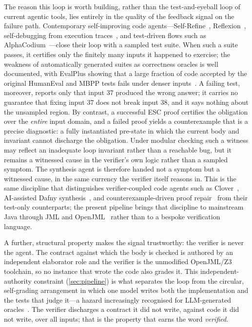 The reason this loop is worth building, rather than the test-and-eyeball loop of current agentic tools, lies entirely in the quality of the feedback signal on the failure path. Contemporary self-improving code agents---Self-Refine~\cite{madaan2023selfrefine}, Reflexion~\cite{shinn2023reflexion}, self-debugging from execution traces~\cite{chen2024selfdebug}, and test-driven flows such as AlphaCodium~\cite{ridnik2024alphacodium}---close their loop with a sampled test suite. When such a suite passes, it certifies only the finitely many inputs it happened to exercise; the weakness of automatically generated suites as correctness oracles is well documented, with EvalPlus showing that a large fraction of code accepted by the original HumanEval and MBPP tests fails under denser inputs~\cite{liu2023evalplus,chen2021codex,austin2021mbpp}. A failing test, moreover, reports only that input $37$ produced the wrong answer; it carries no guarantee that fixing input $37$ does not break input $38$, and it says nothing about the unsampled region. By contrast, a successful ESC proof certifies the obligation over the \emph{entire} input domain, and a failed proof yields a counterexample that is a precise diagnostic: a fully instantiated pre-state in which the current body and invariant cannot discharge the obligation. Under modular checking such a witness may reflect an inadequate loop invariant rather than a reachable bug, but it remains a witnessed cause in the verifier's own logic rather than a sampled symptom. The synthesis agent is therefore handed not a symptom but a witnessed cause, in the same currency the verifier itself reasons in. This is the same discipline that distinguishes verifier-coupled code agents such as Clover~\cite{sun2024clover}, AI-assisted Dafny synthesis~\cite{misu2024dafny,leino2010dafny}, and counterexample-driven proof repair~\cite{yang2025verus,mugnier2025dafnypro} from their test-only counterparts; the present pipeline brings that discipline to mainstream Java through JML and OpenJML~\cite{leavens2006jml,cok2011openjml} rather than to a bespoke verification language.

A further, structural property makes the signal trustworthy: the verifier is never the agent. The contract against which the body is checked is authored by an independent elaborator role and the verifier is the unmodified OpenJML/Z3 toolchain, so no instance that wrote the code also grades it. This independent-authority constraint (\cref{sec:pipeline}) is what separates the loop from the circular, self-grading arrangement in which one model writes both the implementation and the tests that judge it---a hazard increasingly recognised for LLM-generated oracles~\cite{liu2026oracle}. The verifier discharges a contract it did not write, against code it did not write, over all inputs; that is the property that earns the word \emph{verified}.

